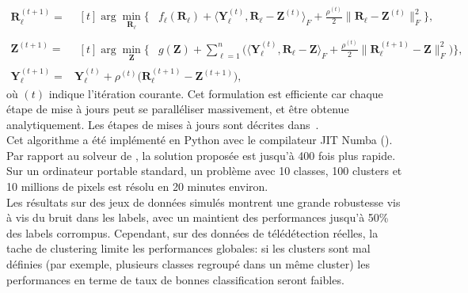 \begin{align}
  \mathbf{R}_{\ell}^{(t+1)} = {} &  \begin{aligned}[t]
    \arg\min_{\mathbf{R}_\ell}\Bigg\{ & f_{\ell}(\mathbf{R}_\ell) + \langle\mathbf{Y}_\ell^{(t)}, \mathbf{R}_\ell - \mathbf{Z}^{(t)}\rangle_F  + \frac{\rho^{(t)}}{2}\|\mathbf{R}_\ell - \mathbf{Z}^{(t)}\|^2_F\Bigg\},
  \end{aligned}\label{eq:consensus:Rl}\\
  \mathbf{Z}^{(t+1)}  = { }&   \begin{aligned}[t]
    \arg\min_{\mathbf{Z}}\Bigg\{ & g(\mathbf{Z}) + \sum_{\ell=1}^{n} \bigg(\langle\mathbf{Y}_\ell^{(t)}, \mathbf{R}_\ell - \mathbf{Z}\rangle_F   + \frac{\rho^{(t)}}{2}\|\mathbf{R}_\ell^{(t+1)} - \mathbf{Z}\|^2_F\bigg)\Bigg\},
  \end{aligned}\label{eq:consensus:Z}\\
  \mathbf{Y}^{(t+1)}_\ell = {} &\mathbf{Y}^{(t)}_\ell + \rho^{(t)}\big(\mathbf{R}_\ell^{(t+1)}-\mathbf{Z}^{(t+1)}\big), \label{eq:consensus:Y}
\end{align}
où \((t)\) indique l'itération courante. Cet formulation est efficiente car chaque étape de mise à jours peut se paralléliser massivement, et être obtenue analytiquement. Les étapes de mises à jours sont décrites dans~\cite{GIRYFOUQUET2021320}.\\

Cet algorithme a été implémenté en Python avec le compilateur JIT Numba (). Par rapport au solveur de \cite{bouveyron-2009-robus-super}, la solution proposée est jusqu'à 400 fois plus rapide. Sur un ordinateur portable standard, un problème avec 10 classes, 100 clusters et 10 millions de pixels est résolu en 20 minutes environ.\\

Les résultats sur des jeux de données simulés montrent une grande robustesse vis à vis du bruit dans les labels, avec un maintient des performances jusqu'à 50\% des labels corrompus. Cependant, sur des données de télédétection réelles, la tache de clustering limite les performances globales: si les clusters sont mal définies (par exemple, plusieurs classes regroupé dans un même cluster) les performances en terme de taux de bonnes classification seront faibles.

